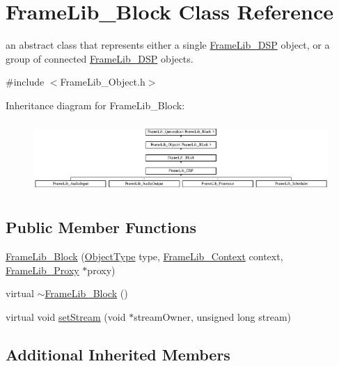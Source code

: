 \hypertarget{class_frame_lib___block}{}\section{Frame\+Lib\+\_\+\+Block Class Reference}
\label{class_frame_lib___block}


an abstract class that represents either a single \hyperlink{class_frame_lib___d_s_p}{Frame\+Lib\+\_\+\+D\+SP} object, or a group of connected \hyperlink{class_frame_lib___d_s_p}{Frame\+Lib\+\_\+\+D\+SP} objects.  




{\ttfamily \#include $<$Frame\+Lib\+\_\+\+Object.\+h$>$}

Inheritance diagram for Frame\+Lib\+\_\+\+Block\+:\begin{figure}[H]
\begin{center}
\leavevmode
\includegraphics[height=2.723735cm]{class_frame_lib___block}
\end{center}
\end{figure}
\subsection*{Public Member Functions}
\begin{DoxyCompactItemize}
\item 
\hyperlink{class_frame_lib___block_a00c67dce2872ec851851570f32b2af5b}{Frame\+Lib\+\_\+\+Block} (\hyperlink{_frame_lib___types_8h_a842c5e2e69277690b064bf363c017980}{Object\+Type} type, \hyperlink{class_frame_lib___context}{Frame\+Lib\+\_\+\+Context} context, \hyperlink{struct_frame_lib___proxy}{Frame\+Lib\+\_\+\+Proxy} $\ast$proxy)
\item 
virtual \hyperlink{class_frame_lib___block_a17c0048595334cb8d63abfcbb77c980d}{$\sim$\+Frame\+Lib\+\_\+\+Block} ()
\item 
virtual void \hyperlink{class_frame_lib___block_ac1e9dee6bc2b3f67cb6635d27797a0ea}{set\+Stream} (void $\ast$stream\+Owner, unsigned long stream)
\end{DoxyCompactItemize}
\subsection*{Additional Inherited Members}


